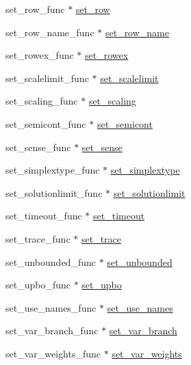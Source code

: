 \begin{DoxyCompactItemize}
\item 
set\+\_\+row\+\_\+func $\ast$ \hyperlink{struct__lprec_acaecf775f4dcafb0fb3ab1891b74a626}{set\+\_\+row}
\item 
set\+\_\+row\+\_\+name\+\_\+func $\ast$ \hyperlink{struct__lprec_aa41fbe9cb58e42d4a51e01603070f3f5}{set\+\_\+row\+\_\+name}
\item 
set\+\_\+rowex\+\_\+func $\ast$ \hyperlink{struct__lprec_a4791185095b3ee9a43576a6f05b1373c}{set\+\_\+rowex}
\item 
set\+\_\+scalelimit\+\_\+func $\ast$ \hyperlink{struct__lprec_acd3edd8c3ebc1215d1639bef8ea39d6f}{set\+\_\+scalelimit}
\item 
set\+\_\+scaling\+\_\+func $\ast$ \hyperlink{struct__lprec_ad7aeb3cf6f244f138e0f2e00e1543b27}{set\+\_\+scaling}
\item 
set\+\_\+semicont\+\_\+func $\ast$ \hyperlink{struct__lprec_a6ad271a8af7da74aedc53dc9169f32e0}{set\+\_\+semicont}
\item 
set\+\_\+sense\+\_\+func $\ast$ \hyperlink{struct__lprec_af9783a33f9c0fcc342ff3dea11b59508}{set\+\_\+sense}
\item 
set\+\_\+simplextype\+\_\+func $\ast$ \hyperlink{struct__lprec_afcaea7596db7dac405bce61495b488fe}{set\+\_\+simplextype}
\item 
set\+\_\+solutionlimit\+\_\+func $\ast$ \hyperlink{struct__lprec_a26d9e2262f9d10cbc0f8f24a4a30af30}{set\+\_\+solutionlimit}
\item 
set\+\_\+timeout\+\_\+func $\ast$ \hyperlink{struct__lprec_a0f90e8221245edad99f39f64a55e2d0a}{set\+\_\+timeout}
\item 
set\+\_\+trace\+\_\+func $\ast$ \hyperlink{struct__lprec_ac2d84ab32621dd281194d739d945dcdf}{set\+\_\+trace}
\item 
set\+\_\+unbounded\+\_\+func $\ast$ \hyperlink{struct__lprec_a08490c83e7b0f8c87dd4ce55bb3381df}{set\+\_\+unbounded}
\item 
set\+\_\+upbo\+\_\+func $\ast$ \hyperlink{struct__lprec_aea5a946723d1d79a7d2fc6c84b3a9616}{set\+\_\+upbo}
\item 
set\+\_\+use\+\_\+names\+\_\+func $\ast$ \hyperlink{struct__lprec_a6037066cd1d078c58df33e198fcab7b8}{set\+\_\+use\+\_\+names}
\item 
set\+\_\+var\+\_\+branch\+\_\+func $\ast$ \hyperlink{struct__lprec_abb996d9af6895c09dd0f15de2d12ba4d}{set\+\_\+var\+\_\+branch}
\item 
set\+\_\+var\+\_\+weights\+\_\+func $\ast$ \hyperlink{struct__lprec_a171752fabc864dadcb63c12f15f3dc7a}{set\+\_\+var\+\_\+weights}

\end{DoxyCompactItemize}
